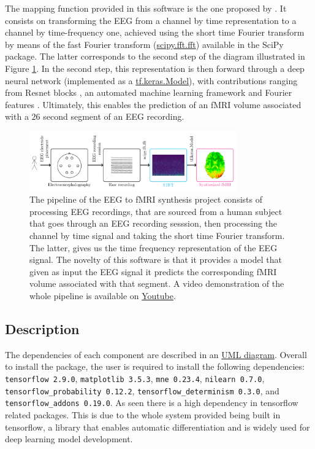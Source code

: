 The mapping function provided in this software is the one proposed by \cite{calhas2022eeg}. It consists on transforming the EEG from a channel by time representation to a channel by time-frequency one, achieved using the short time Fourier transform \cite{allen1977short} by means of the fast Fourier transform (\href{https://docs.scipy.org/doc/scipy/reference/generated/scipy.fft.fft.html}{scipy.fft.fft}) available in the SciPy package. The latter corresponds to the second step of the diagram illustrated in Figure \ref{fig:pipeline}. In the second step, this representation is then forward through a deep neural network (implemented as a \href{https://www.tensorflow.org/api_docs/python/tf/keras/Model}{tf.keras.Model}), with contributions ranging from Resnet blocks \cite{he2016deep}, an automated machine learning framework \cite{calhas2022automatic} and Fourier features \cite{tancik2020fourier}. Ultimately, this enables the prediction of an fMRI volume associated with a $26$ second segment of an EEG recording. 

\begin{figure}[t]
    \centering
    \includegraphics[width=0.8\textwidth]{figures/diagram.png}
    \caption{The pipeline of the EEG to fMRI synthesis project consists of processing EEG recordings, that are sourced from a human subject that goes through an EEG recording sesssion, then processing the channel by time signal and taking the short time Fourier transform. The latter, gives us the time frequency representation of the EEG signal. The novelty of this software is that it provides a model that given as input the EEG signal it predicts the corresponding fMRI volume associated with that segment. A video demonstration of the whole pipeline is available on \href{https://youtu.be/47uJbI0hU_I}{Youtube}.}
    \label{fig:pipeline}
\end{figure}

\subsection{Description}\label{section:description}

The dependencies of each component are described in an \href{https://github.com/eeg-to-fmri/eeg-to-fmri/blob/main/project_UML.pdf}{UML diagram}. Overall to install the package, the user is required to install the following dependencies: \texttt{tensorflow 2.9.0}, \texttt{matplotlib 3.5.3}, \texttt{mne 0.23.4}, \texttt{nilearn 0.7.0}, \texttt{tensorflow\_probability 0.12.2}, \texttt{tensorflow\_determinism 0.3.0}, and \texttt{tensorflow\_addons 0.19.0}. As seen there is a high dependency in tensorflow related packages. This is due to the whole system provided being built in tensorflow, a library that enables automatic differentiation and is widely used for deep learning model development.

